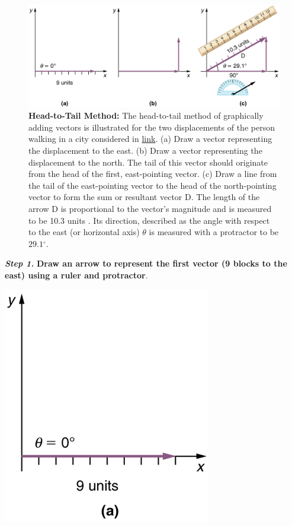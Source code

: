 \documentclass[
]{book}
\begin{document}
\begin{figure}
\hypertarget{import-auto-id1165298643218}{%
\centering
\includegraphics{images/Figure_03_02_03.jpg}
\caption{\textbf{Head-to-Tail Method:} The head-to-tail method of graphically adding
vectors is illustrated for the two displacements of the person walking
in a city considered in
\protect\hyperlink{import-auto-id1165298666909}{link}. (a) Draw a
vector representing the displacement to the east. (b) Draw a vector
representing the displacement to the north. The tail of this vector
should originate from the head of the first, east-pointing vector. (c)
Draw a line from the tail of the east-pointing vector to the head of the
north-pointing vector to form the sum or {resultant
vector} \(\text{D}{}\). The length of the arrow
\(\text{D}{}\) is proportional to the vector's magnitude and is measured
to be 10.3 units . Its direction, described as the angle with respect to
the east (or horizontal axis) \(\theta{}\) is measured with a protractor
to be
\({\text{29}\text{.}1{^\circ}}{}\).}\label{import-auto-id1165298643218}
}
\end{figure}

\textbf{\emph{Step 1.}} \textbf{Draw an arrow to represent the first vector (9 blocks to
the east) using a ruler and protractor}.

\includegraphics{images/Figure_03_02_04a.jpg}
\end{document}
